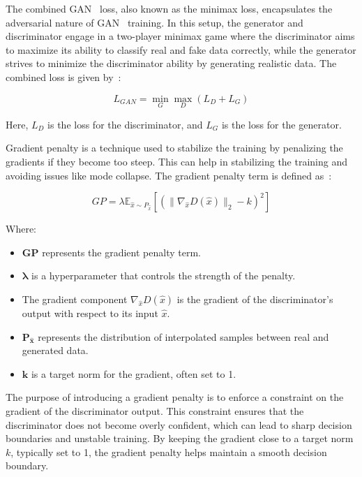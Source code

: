\documentclass[12pt,a4paper]{report}
\begin{document}
The combined GAN~\cite{goodfellow2014generative} loss, also known as the minimax loss, encapsulates the adversarial nature of GAN~\cite{goodfellow2014generative} training. In this setup, the generator and discriminator engage in a two-player minimax game where the discriminator aims to maximize its ability to classify real and fake data correctly, while the generator strives to minimize the discriminator ability by generating realistic data. The combined loss is given by~\cite{gan}:

\begin{equation}
  L_{GAN} = \min_G \max_D (L_D + L_G)
\end{equation}

Here, \( L_D \) is the loss for the discriminator, and \( L_G \) is the loss for the generator.

Gradient penalty is a technique used to stabilize the training by penalizing the gradients if they become too steep. This can help in stabilizing the training and avoiding issues like mode collapse. The gradient penalty term is defined as~\cite{gan}:

\begin{equation}
  GP = \lambda \mathbb{E}_{\hat{x} \sim P_{\hat{x}}} \left[ \left( \| \nabla_{\hat{x}} D(\hat{x}) \|_2 - k \right)^2 \right]
\end{equation}

Where:
\begin{itemize}
  \item \(\mathbf{GP}\) represents the gradient penalty term.
  \item \(\mathbf{\lambda}\) is a hyperparameter that controls the strength of the penalty.
  \item The gradient component \(\nabla_{\hat{x}} D(\hat{x})\) is the gradient of the discriminator’s output with respect to its input \(\hat{x}\).
  \item \(\mathbf{P_{\hat{x}}}\) represents the distribution of interpolated samples between real and generated data.
  \item \(\mathbf{k}\) is a target norm for the gradient, often set to 1.
\end{itemize}

The purpose of introducing a gradient penalty is to enforce a constraint on the gradient of the discriminator output. This constraint ensures that the discriminator does not become overly confident, which can lead to sharp decision boundaries and unstable training. By keeping the gradient close to a target norm \(k\), typically set to 1, the gradient penalty helps maintain a smooth decision boundary.
\end{document}
